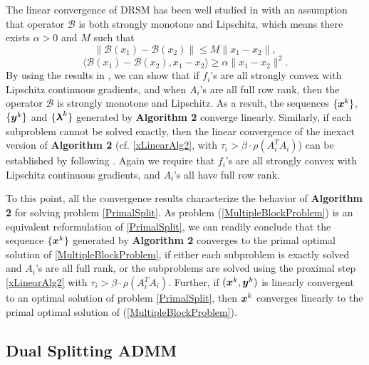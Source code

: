 \documentclass{mcom-l}
\theoremstyle{definition}
\theoremstyle{remark}
\numberwithin{equation}{section}
\begin{document}
{The linear convergence of DRSM has been well studied in \cite[{} 4]{LionsMercier1979} with an assumption that operator ${\mathcal{B}}$ is both strongly monotone and Lipschitz, which means there exists $\alpha > 0$ and $M$ such that
$$
\|{\mathcal{B}} (x_1) - {\mathcal{B}} (x_2)\| \le M \| x_1 - x_2 \|,
$$
$$
\langle {\mathcal{B}} (x_1) - {\mathcal{B}} (x_2), x_1 - x_2 \rangle \ge \alpha \| x_1 - x_2 \|^2.
$$
By using the results in \cite{GoebelRockafellar2008,Rockafellar1996,RockafellarWets1998}, we can show that if $f_i$'s are all strongly convex with Lipschitz continuous gradients, and when $A_i$'s are all full row rank, then the operator ${\mathcal{B}}$ is strongly monotone and Lipschitz. As a result, the sequences $\{{{\mbox{\boldmath $x$}}}^k\}$, $\{{{\mbox{\boldmath $y$}}}^k\}$ and $\{{{\mbox{\boldmath $\lambda$}}}^k\}$ generated by {\bf{Algorithm 2}} converge linearly. Similarly, if each subproblem cannot be solved exactly, then the linear convergence of the inexact version of {\bf Algorithm 2} (cf. \eqref{xLinearAlg2}, with $\tau_i > \beta \cdot \rho (A_i^T A_i)$) can be established by following \cite[{} 4]{DengYin2012}. Again we require that $f_i$'s are all strongly convex with Lipschitz continuous gradients, and $A_i$'s all have full row rank.

To this point, all the convergence results characterize the behavior of {\bf Algorithm 2} for solving problem \eqref{PrimalSplit}. As problem (\ref{MultipleBlockProblem}) is an equivalent reformulation of \eqref{PrimalSplit}, we can readily conclude that the sequence $\{\mbox{\boldmath$x$}^k\}$ generated by {\bf{Algorithm 2}} converges to the primal optimal solution of \eqref{MultipleBlockProblem}, if either each subproblem is exactly solved and $A_i$'s are all full rank, or the subproblems are solved using the proximal step \eqref{xLinearAlg2} with $\tau_i > \beta \cdot \rho (A_i^T A_i)$. Further, if $(\mbox{\boldmath$x$}^k, {{\mbox{\boldmath $y$}}}^k)$ is linearly convergent to an optimal solution of problem \eqref{PrimalSplit}, then $\mbox{\boldmath$x$}^k$ converges linearly to the primal optimal solution of (\ref{MultipleBlockProblem}).

\subsection{Dual Splitting ADMM}\label{subDualSplit} \setcounter{equation}{0}

}
\end{document}
